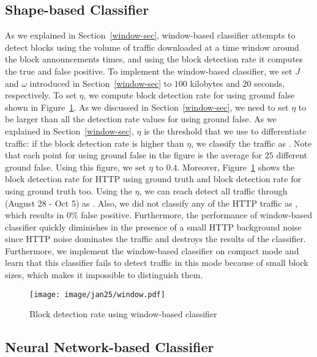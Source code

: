 \subsection{Shape-based Classifier}
As we explained in Section~\ref{window-sec}, window-based classifier attempts to detect \bc blocks using the volume of traffic downloaded at a time window around the block announcements times, and using the block detection rate it computes the true and false positive.
To implement the window-based classifier, we set $J$ and $\omega$ introduced in Section~\ref{window-sec} to $100$ kilobytes and $20$ seconds, respectively. 
To set $\eta$, we compute block detection rate for \bc using ground false shown in Figure~\ref{fig:window}. As we discussed in Section~\ref{window-sec}, we need to set $\eta$ to be larger than all the detection rate values for \bc using ground false. 
As we explained in Section~\ref{window-sec}, $\eta$ is the threshold that we use to differentiate \bc traffic: if the block detection rate is higher than $\eta$, we classify the traffic as \bc. Note that each point for \bc using ground false in the figure is the average for $25$ different ground false. Using this figure, we set $\eta$ to $0.4$. Moreover, Figure~\ref{fig:window} shows the block detection rate for HTTP using ground truth and block detection rate for \bc using ground truth too. Using the $\eta$, we can reach detect all \bc traffic through (August 28 - Oct 5) as \bc. Also, we did not classify any of the HTTP traffic as \bc, which results in $0\%$ false positive. Furthermore, the performance of window-based classifier quickly diminishes in the presence of a small HTTP background noise since HTTP noise dominates the \bc traffic and destroys the results of the classifier. Furthermore, we implement the window-based classifier on \bc compact mode and learn that this classifier fails to detect \bc traffic in this mode because of small block sizes, which makes it impossible to distinguish them.



\begin{figure}
\centering
\texttt{[image: image/jan25/window.pdf]}%
\caption{Block detection rate using window-based classifier}
\label{fig:window}
\end{figure}
\subsection{Neural Network-based Classifier}

